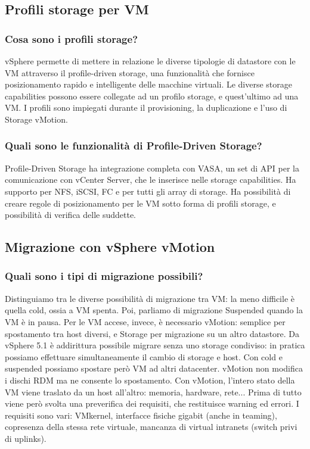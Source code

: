 \documentclass[11pt]{article}
\begin{document}
\subsection{Profili storage per VM}
\subsubsection{Cosa sono i profili storage?}
vSphere permette di mettere in relazione le diverse tipologie di datastore con le VM attraverso il profile-driven storage, una funzionalità che fornisce posizionamento rapido e intelligente delle macchine virtuali. Le diverse storage capabilities possono essere collegate ad un profilo storage, e quest'ultimo ad una VM. I profili sono impiegati durante il provisioning, la duplicazione e l'uso di Storage vMotion. 

\subsubsection{Quali sono le funzionalità di Profile-Driven Storage?}
Profile-Driven Storage ha integrazione completa con VASA, un set di API per la comunicazione con vCenter Server, che le inserisce nelle storage capabilities. Ha supporto per NFS, iSCSI, FC e per tutti gli array di storage. Ha possibilità di creare regole di posizionamento per le VM sotto forma di profili storage, e possibilità di verifica delle suddette.

\subsection{Migrazione con vSphere vMotion}
\subsubsection{Quali sono i tipi di migrazione possibili?}
Distinguiamo tra le diverse possibilità di migrazione tra VM: la meno difficile è quella cold, ossia a VM spenta. Poi, parliamo di migrazione Suspended quando la VM è in pausa. Per le VM accese, invece, è necessario vMotion: semplice per spostamento tra host diversi, e Storage per migrazione su un altro datastore. Da vSphere 5.1 è addirittura possibile migrare senza uno storage condiviso: in pratica possiamo effettuare simultaneamente il cambio di storage e host. Con cold e suspended possiamo spostare però VM ad altri datacenter. vMotion non modifica i dischi RDM ma ne consente lo spostamento. Con vMotion, l'intero stato della VM viene traslato da un host all'altro: memoria, hardware, rete... Prima di tutto viene però svolta una preverifica dei requisiti, che restituisce warning ed errori. I requisiti sono vari: VMkernel, interfacce fisiche gigabit (anche in teaming), copresenza della stessa rete virtuale, mancanza di virtual intranets (switch privi di uplinks). 
\end{document}
